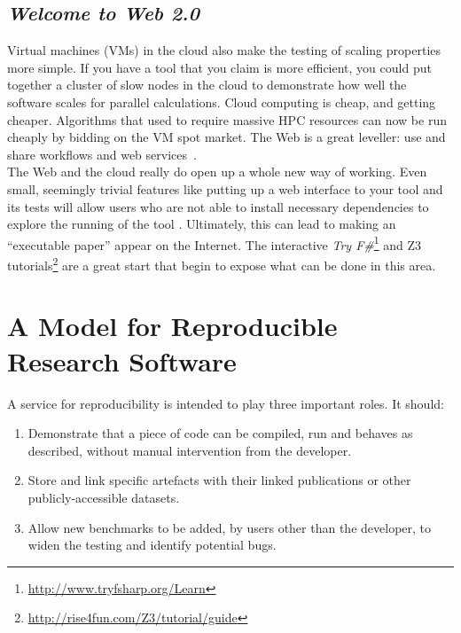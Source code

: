 \documentclass[a4paper,11pt]{article}
\begin{document}
\subsection{{\emph{Welcome to Web 2.0}}}

Virtual machines (VMs) in the cloud also make the testing of scaling
properties more simple.  If you have a tool that you claim is more
efficient, you could put together a cluster of slow nodes in the cloud
to demonstrate how well the software scales for parallel calculations.
Cloud computing is cheap, and getting cheaper. Algorithms that used to
require massive HPC resources can now be run cheaply by bidding on the
VM spot market. The Web is a great leveller: use and share workflows
and web services~\cite{crick-et-al:2009b,oabarriaga-et-al:2014}.\\

 The Web and the
cloud really do open up a whole new way of working. Even small,
seemingly trivial features like putting up a web interface to your
tool and its tests will allow users who are not able to install
necessary dependencies to explore the running of the tool
\cite{Hall2014}. Ultimately, this can lead to making an ``executable
paper'' appear on the Internet. The interactive {\em Try
F\#}\footnote{\url{http://www.tryfsharp.org/Learn}} and Z3
tutorials\footnote{\url{http://rise4fun.com/Z3/tutorial/guide}} are a
great start that begin to expose what can be done in this area.


\section{A Model for Reproducible Research Software}\label{sec:conclusion} 

A service for reproducibility is intended to play three important
roles. It should:

\begin{enumerate}
\item Demonstrate that a piece of code can be compiled, run
and behaves as described, without manual intervention from the
developer.
\item Store and link specific artefacts with their linked
publications or other publicly-accessible datasets.
\item Allow new benchmarks to be added, by users other than
the developer, to widen the testing and identify potential bugs.
\end{enumerate}
\end{document}

